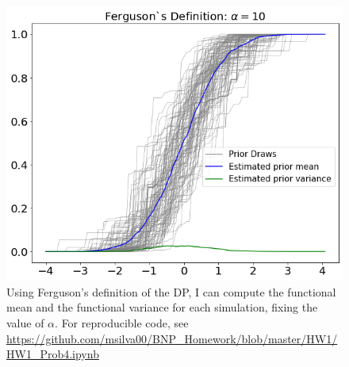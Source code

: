 \documentclass[a4paper, 10pt]{article}
\begin{document}
\begin{enumerate}
\begin{enumerate}
\begin{center}
\begin{figure}[h!]
                \includegraphics[scale = 0.35]{b3.png}
                \caption{Using Ferguson's definition of the DP, I can compute the functional mean and the functional variance for each simulation, fixing the value of $\alpha$. For reproducible code, see \url{https://github.com/msilva00/BNP_Homework/blob/master/HW1/HW1_Prob4.ipynb}}
                \label{part_b}
            \end{figure}
        \end{center}
        

\end{enumerate}
\end{enumerate}
\end{document}
